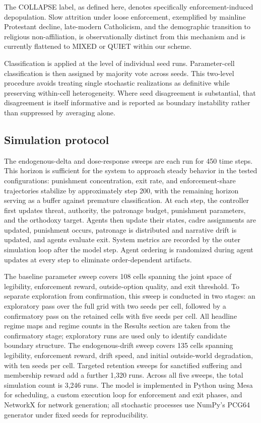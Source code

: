\documentclass[12pt]{article}
\begin{document}
The COLLAPSE label, as defined here, denotes specifically enforcement-induced depopulation. Slow attrition under loose enforcement, exemplified by mainline Protestant decline, late-modern Catholicism, and the demographic transition to religious non-affiliation, is observationally distinct from this mechanism and is currently flattened to MIXED or QUIET within our scheme.

Classification is applied at the level of individual seed runs. Parameter-cell classification is then assigned by majority vote across seeds. This two-level procedure avoids treating single stochastic realizations as definitive while preserving within-cell heterogeneity. Where seed disagreement is substantial, that disagreement is itself informative and is reported as boundary instability rather than suppressed by averaging alone.

\subsection{Simulation protocol}

The endogenous-delta and dose-response sweeps are each run for 450 time steps. This horizon is sufficient for the system to approach steady behavior in the tested configurations: punishment concentration, exit rate, and enforcement-share trajectories stabilize by approximately step 200, with the remaining horizon serving as a buffer against premature classification. At each step, the controller first updates threat, authority, the patronage budget, punishment parameters, and the orthodoxy target. Agents then update their states, cadre assignments are updated, punishment occurs, patronage is distributed and narrative drift is updated, and agents evaluate exit. System metrics are recorded by the outer simulation loop after the model step. Agent ordering is randomized during agent updates at every step to eliminate order-dependent artifacts.

The baseline parameter sweep covers 108 cells spanning the joint space of legibility, enforcement reward, outside-option quality, and exit threshold. To separate exploration from confirmation, this sweep is conducted in two stages: an exploratory pass over the full grid with two seeds per cell, followed by a confirmatory pass on the retained cells with five seeds per cell. All headline regime maps and regime counts in the Results section are taken from the confirmatory stage; exploratory runs are used only to identify candidate boundary structure. The endogenous-drift sweep covers 135 cells spanning legibility, enforcement reward, drift speed, and initial outside-world degradation, with ten seeds per cell. Targeted retention sweeps for sanctified suffering and membership reward add a further 1,320 runs. Across all five sweeps, the total simulation count is 3,246 runs. The model is implemented in Python using Mesa for scheduling, a custom execution loop for enforcement and exit phases, and NetworkX for network generation; all stochastic processes use NumPy's PCG64 generator under fixed seeds for reproducibility.
\end{document}
